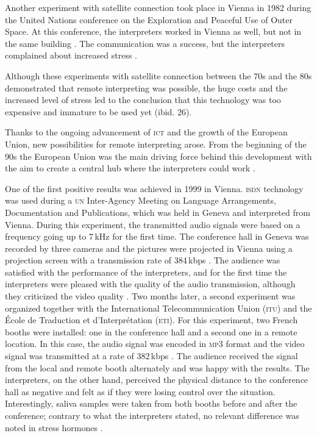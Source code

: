 \documentclass[output=paper]{langsci/langscibook}
\begin{document}
Another experiment with satellite connection took place in Vienna in 1982 during the United Nations conference on the Exploration and Peaceful Use of Outer Space. At this conference, the interpreters worked in Vienna as well, but not in the same building \citep[10]{Andres2009}. The communication was a success, but the interpreters complained about increased stress \citep[26]{UNESCO1987}.

Although these experiments with satellite connection between the 70s and the 80s demonstrated that remote interpreting was possible, the huge costs and the increased level of stress led to the conclusion that this technology was too expensive and immature to be used yet (ibid. 26).

Thanks to the ongoing advancement of \textsc{ict} and the growth of the European Union, new possibilities for remote interpreting arose. From the beginning of the 90s the European Union was the main driving force behind this development with the aim to create a central hub where the interpreters could work \citep[3]{Braun2011b}.

One of the first positive results was achieved in 1999 in Vienna. \textsc{isdn} technology was used during a \textsc{un} Inter-Agency Meeting on Language Arrangements, Documentation and Publications, which was held in Geneva and interpreted from Vienna. During this experiment, the transmitted audio signals were based on a frequency going up to 7\,kHz for the first time. The conference hall in Geneva was recorded by three cameras and the pictures were projected in Vienna using a projection screen with a transmission rate of 384\,kbps \citep[63]{Mouzourakis2006}. The audience was satisfied with the performance of the interpreters, and for the first time the interpreters were pleased with the quality of the audio transmission, although they criticized the video quality \citep[11]{Andres2009}. Two months later, a second experiment was organized together with the International Telecommunication Union (\textsc{itu}) and the École de Traduction et d’Interprétation (\textsc{eti}). For this experiment, two French booths were installed: one in the conference hall and a second one in a remote location. In this case, the audio signal was encoded in \textsc{mp3} format and the video signal was transmitted at a rate of 382\,kbps \citep[63]{Mouzourakis2006}. The audience received the signal from the local and remote booth alternately and was happy with the results. The interpreters, on the other hand, perceived the physical distance to the conference hall as negative and felt as if they were losing control over the situation. Interestingly, saliva samples were taken from both booths before and after the conference; contrary to what the interpreters stated, no relevant difference was noted in stress hormones \citep{Moser-Mercer2003}.
\end{document}
